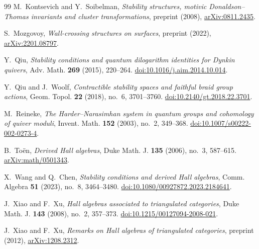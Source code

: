 \documentclass[a4paper,12pt]{amsart}
\numberwithin{equation}{section}
\newcommand{\1}{\mathbf{1}}
\begin{document}
\begin{thebibliography}{99}
M.~Kontsevich and Y.~Soibelman,
\emph{Stability structures, motivic Donaldson--Thomas invariants and cluster transformations},
preprint (2008),
\href{https://arxiv.org/abs/0811.2435}{arXiv:0811.2435}.

S.~Mozgovoy,
\emph{Wall-crossing structures on surfaces},
preprint (2022),
\href{https://arxiv.org/abs/2201.08797}{arXiv:2201.08797}.

Y.~Qiu,
\emph{Stability conditions and quantum dilogarithm identities for Dynkin quivers},
Adv. Math. \textbf{269} (2015), 220--264.
\href{https://doi.org/10.1016/j.aim.2014.10.014}{doi:10.1016/j.aim.2014.10.014}.

Y.~Qiu and J.~Woolf,
\emph{Contractible stability spaces and faithful braid group actions},
Geom. Topol. \textbf{22} (2018), no.~6, 3701--3760.
\href{https://doi.org/10.2140/gt.2018.22.3701}
{doi:10.2140/gt.2018.22.3701}.

M.~Reineke,
\emph{The Harder--Narasimhan system in quantum groups and cohomology of quiver moduli},
Invent. Math. \textbf{152} (2003), no.~2, 349--368.
\href{https://doi.org/10.1007/s00222-002-0273-4}{doi:10.1007/s00222-002-0273-4}.

B.~To\"en,
\emph{Derived Hall algebras},
Duke Math. J. \textbf{135} (2006), no.~3, 587--615.
\href{https://arxiv.org/abs/math/0501343}{arXiv:math/0501343}.

X.~Wang and Q.~Chen,
\emph{Stability conditions and derived Hall algebras},
Comm. Algebra \textbf{51} (2023), no.~8, 3464--3480.
\href{https://doi.org/10.1080/00927872.2023.2184641}{doi:10.1080/00927872.2023.2184641}.

J.~Xiao and F.~Xu,
\emph{Hall algebras associated to triangulated categories},
Duke Math. J. \textbf{143} (2008), no.~2, 357--373.
\href{https://doi.org/10.1215/00127094-2008-021}{doi:10.1215/00127094-2008-021}.

J.~Xiao and F.~Xu,
\emph{Remarks on Hall algebras of triangulated categories},
preprint (2012),
\href{https://arxiv.org/abs/1208.2312}{arXiv:1208.2312}.

\end{thebibliography}
\end{document}
